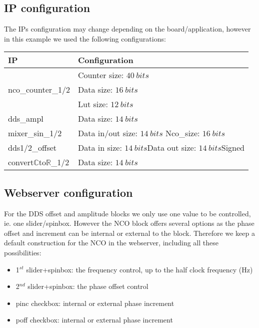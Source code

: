 \documentclass[12pt,oneside]{article}
\begin{document}
\subsection{IP configuration}
\vspace{0.5cm}
The IPs configuration may change depending on the board/application, however in this example we used the following configurations:
\begin{center}
	\begin{tabular}{|>{\centering\arraybackslash}m{.3\linewidth} | >{\centering\arraybackslash}m{.3\linewidth} |}
\hline
IP & Configuration \\
\hline
 & Counter size: $40~bits$\\ nco\_counter\_1/2 &Data size: $16~bits$\\ &Lut size: $12~bits$ \\
\hline
dds\_ampl&Data size: $14~bits$ \\
\hline
mixer\_sin\_1/2&Data in/out size: $14~bits$ \newline Nco\_size: $16~bits$ \\
\hline
dds1/2\_offset&Data in size: $14~bits$\newline Data out size: $14~bits$\newline Signed \\
\hline
convert$\mathbb{C}$to$\mathbb{R}$\_1/2&Data size: $14~bits$\\
\hline
\end{tabular}
\end{center}
\vspace{0.1cm}
\subsection{Webserver configuration}\label{subsec:doubleDDSws}

For the DDS offset and amplitude blocks we only use one value to be controlled, ie. one slider/spinbox. However the NCO block offers several options as the phase offset and increment can be internal or external to the block. Therefore we keep a default construction for the NCO in the webserver, including all these possibilities: 
\begin{itemize}
	\setlength\itemsep{-0.1cm}
	\item 1$^{st}$ slider+spinbox: the frequency control, up to the half clock frequency (Hz)
	\item 2$^{nd}$ slider+spinbox: the phase offset control
	\item pinc checkbox: internal or external phase increment
	\item poff checkbox: internal or external phase increment
\end{itemize} 
\end{document}
